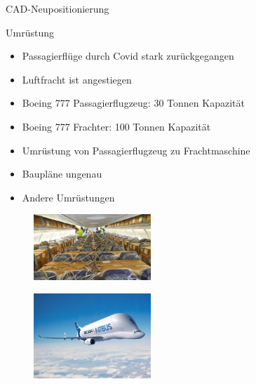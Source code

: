 \begin{frame}{CAD-Neupositionierung}
    \begin{minipage}[b]{0.7\textwidth}
    \begin{block}{Umrüstung}

    \begin{itemize}
          \item Passagierflüge durch Covid stark zurückgegangen
          \item Luftfracht ist angestiegen
          \item Boeing 777 Passagierflugzeug: 30 Tonnen Kapazität
          \item Boeing 777 Frachter: 100 Tonnen Kapazität
          \item Umrüstung von Passagierflugzeug zu Frachtmaschine
          \item Baupläne ungenau
          \item Andere Umrüstungen
      \end{itemize}
    \end{block}
    \end{minipage}
    \begin{minipage}[b]{0.27\textwidth}
        \begin{figure}
            \begin{minipage}{\textwidth}
                \includegraphics[width=125pt]{img_niklas/frachtMaschine.jpg}
                \label{fig:my_label}
            \end{minipage}
            \begin{minipage}{\textwidth}
                \includegraphics[width=125pt]{img_niklas/frachtFlugzeug.jpg}
            \label{fig:my_label}
            \end{minipage}
        \end{figure}
    \end{minipage}

\end{frame}

